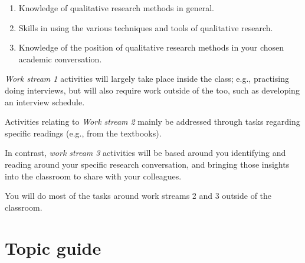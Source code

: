 \documentclass[]{book}
\providecommand{\tightlist}{%
  \setlength{\itemsep}{0pt}\setlength{\parskip}{0pt}}
\theoremstyle{definition}
\theoremstyle{definition}
\theoremstyle{definition}
\theoremstyle{remark}
\begin{document}
\begin{enumerate}
\def\labelenumi{\arabic{enumi}.}
\tightlist
\item
  Knowledge of qualitative research methods in general.
\item
  Skills in using the various techniques and tools of qualitative
  research.
\item
  Knowledge of the position of qualitative research methods in your
  chosen academic conversation.
\end{enumerate}

\emph{Work stream 1} activities will largely take place inside the
class; e.g., practising doing interviews, but will also require work
outside of the too, such as developing an interview schedule.

Activities relating to \emph{Work stream 2} mainly be addressed through
tasks regarding specific readings (e.g., from the textbooks).

In contrast, \emph{work stream 3} activities will be based around you
identifying and reading around your specific research conversation, and
bringing those insights into the classroom to share with your
colleagues.

You will do most of the tasks around work streams 2 and 3 outside of the
classroom.

\hypertarget{topic-guide}{%
\section{Topic guide}\label{topic-guide}}
\end{document}
